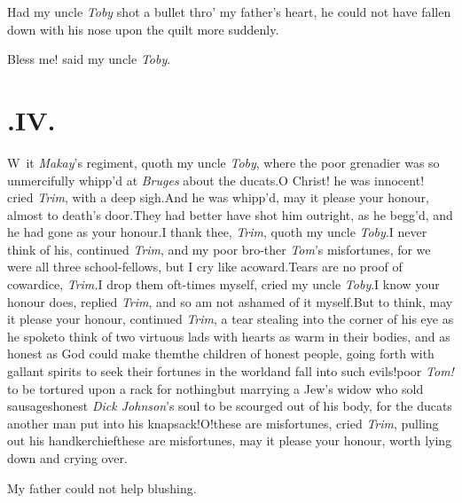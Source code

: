 \documentclass{article}
\begin{document}
\tsh Had my uncle \textit{Toby} shot a bullet thro’ my
father’s heart, he could not have fallen down with his nose
upon the quilt more suddenly.

Bless me! said my uncle \textit{Toby}.

\bigskip
\section{.\enspace IV.}

\lettrine{W}{\,} it \textit{Makay}’s regiment, quoth\break
my uncle \textit{Toby}, where the poor\break
grenadier was so unmercifully whipp’d at \textit{Bruges}
about the ducats.\tsk O Christ! he was innocent! cried
\textit{Trim}, with a deep sigh.\tsk And he was whipp’d, may
it please your honour, almost to death’s door.\tsk They had
better have shot him outright, as he begg’d, and he had gone
as your honour.\tsh I thank thee, \textit{Trim}, quoth my uncle
\textit{Toby}.\tsh I never think of his, continued
\textit{Trim}, and my poor bro-\break ther \textit{Tom}’s
misfortunes, for we were all three school-fellows, but I cry
like a\break coward.\tsh Tears are no proof of cowardice,
\textit{Trim.}\tsk I drop them oft-times myself, cried my
uncle \textit{Toby}.\tsh I know your honour does, replied
\textit{Trim}, and so am not ashamed of it myself.\tsk But
to think, may it please your honour, continued
\textit{Trim}, a tear stealing into the corner of his eye as
he spoke\tsk to think of two virtuous lads with hearts as
warm in their bodies, and as honest as God could make
them\tsk the children of honest people, going forth with
gallant spirits to seek their fortunes in the world\tsk and
fall into such evils!\tsk poor \textit{Tom!} to be tortured
upon a rack for nothing\tsk but marrying a Jew’s widow who
sold sausages\tsk honest \textit{Dick Johnson}’s soul to be
scourged out of his body, for the ducats another man put
into his knapsack!\tsk O!\tsk these are misfortunes, cried
\textit{Trim}, pulling out his handkerchief\tsk these
are misfortunes, may it please your honour, worth lying down
and crying over.


\tsk My father could not help blushing.
\end{document}

